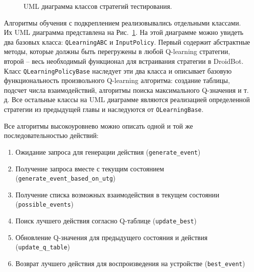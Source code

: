 \begin{figure}[h]
\caption{UML диаграмма классов стратегий тестирования.}
\label{UML}
\end{figure}

Алгоритмы обучения с подкреплением реализовывались отдельными классами. Их UML диаграмма представлена на Рис.~\ref{UML}. На этой диаграмме можно увидеть два базовых класса: \texttt{QLearningABC} и \texttt{InputPolicy}. Первый содержит абстрактные методы, которые должны быть перегружены в любой Q-learning стратегии, второй -- весь необходимый функционал для встраивания стратегии в DroidBot. Класс \texttt{QLearningPolicyBase} наследует эти два класса и описывает базовую функциональность произвольного Q-learning алгоритма: создание таблицы, подсчет числа взаимодействий, алгоритмы поиска максимального Q-значения и т. д. Все остальные классы на UML диаграмме являются реализацией определенной стратегии из предыдущей главы и наследуются от \texttt{OLearningBase}. 

Все алгоритмы высокоуровнево можно описать одной и той же последовательностью действий:

\begin{enumerate}

\item Ожидание запроса для генерации действия (\texttt{generate\_event})

\item Получение запроса вместе с текущим состоянием (\texttt{generate\_event\_based\_on\_utg})

\item Получение списка возможных взаимодействия в текущем состоянии (\texttt{possible\_events})

\item Поиск лучшего действия согласно Q-таблице (\texttt{update\_best})

\item Обновление Q-значения для предыдущего состояния и действия (\texttt{update\_q\_table})

\item Возврат лучшего действия для воспроизведения на устройстве (\texttt{best\_event})

\end{enumerate}